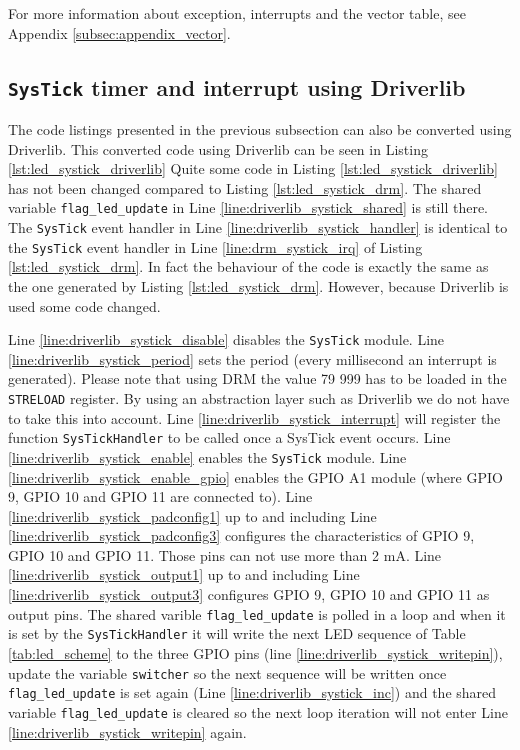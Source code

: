 For more information about exception, interrupts and the vector table, see Appendix \ref{subsec:appendix_vector}.

\newpage
\subsection{\texttt{SysTick} timer and interrupt using Driverlib}

The code listings presented in the previous subsection can also be converted using Driverlib.
This converted code using Driverlib can be seen in Listing \ref{lst:led_systick_driverlib}
Quite some code in Listing \ref{lst:led_systick_driverlib} has not been changed compared to Listing \ref{lst:led_systick_drm}.
The shared variable \texttt{flag\_led\_update} in Line \ref{line:driverlib_systick_shared} is still there.
The \texttt{SysTick} event handler in Line \ref{line:driverlib_systick_handler} is identical to the \texttt{SysTick} event handler in Line \ref{line:drm_systick_irq} of Listing \ref{lst:led_systick_drm}.
In fact the behaviour of the code is exactly the same as the one generated by Listing \ref{lst:led_systick_drm}.
However, because Driverlib is used some code changed.\newline

Line \ref{line:driverlib_systick_disable} disables the \texttt{SysTick} module. 
Line \ref{line:driverlib_systick_period} sets the period (every millisecond an interrupt is generated).
Please note that using DRM the value 79 999 has to be loaded in the \texttt{STRELOAD} register.
By using an abstraction layer such as Driverlib we do not have to take this into account.
Line \ref{line:driverlib_systick_interrupt} will register the function \texttt{SysTickHandler} to be called once a SysTick event occurs.
Line \ref{line:driverlib_systick_enable} enables the \texttt{SysTick} module.
Line \ref{line:driverlib_systick_enable_gpio} enables the GPIO A1 module (where GPIO 9, GPIO 10 and GPIO 11 are connected to).
Line \ref{line:driverlib_systick_padconfig1} up to and including Line \ref{line:driverlib_systick_padconfig3} configures the characteristics of GPIO 9, GPIO 10 and GPIO 11. Those pins can not use more than 2 mA.
Line \ref{line:driverlib_systick_output1} up to and including Line \ref{line:driverlib_systick_output3} configures GPIO 9, GPIO 10 and GPIO 11 as output pins.\newline
The shared varible \texttt{flag\_led\_update} is polled in a loop and when it is set by the \texttt{SysTickHandler} it will write the next LED sequence of Table \ref{tab:led_scheme} to the three GPIO pins (line \ref{line:driverlib_systick_writepin}), update the variable \texttt{switcher} so the next sequence will be written once \texttt{flag\_led\_update} is set again (Line \ref{line:driverlib_systick_inc}) and the shared variable \texttt{flag\_led\_update} is cleared so the next loop iteration will not enter Line \ref{line:driverlib_systick_writepin} again. \newline

